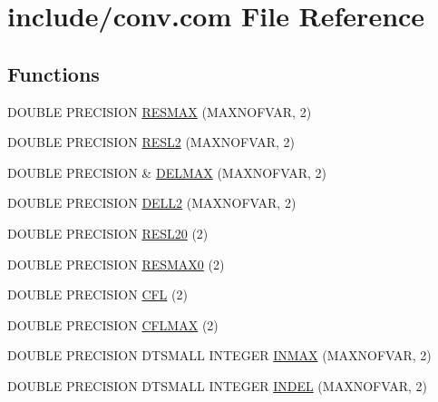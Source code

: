 \hypertarget{conv_8com}{\section{include/conv.com File Reference}
\label{conv_8com}
}
\subsection*{Functions}
\begin{DoxyCompactItemize}
\item 
D\-O\-U\-B\-L\-E P\-R\-E\-C\-I\-S\-I\-O\-N \hyperlink{conv_8com_adf31d6b2d57a615da367e41276e2c368}{R\-E\-S\-M\-A\-X} (M\-A\-X\-N\-O\-F\-V\-A\-R, 2)
\item 
D\-O\-U\-B\-L\-E P\-R\-E\-C\-I\-S\-I\-O\-N \hyperlink{conv_8com_a035fe6706d7b732830ffafb620f8a07b}{R\-E\-S\-L2} (M\-A\-X\-N\-O\-F\-V\-A\-R, 2)
\item 
D\-O\-U\-B\-L\-E P\-R\-E\-C\-I\-S\-I\-O\-N \& \hyperlink{conv_8com_aa36704749632fb4cb4f4b32adae95af0}{D\-E\-L\-M\-A\-X} (M\-A\-X\-N\-O\-F\-V\-A\-R, 2)
\item 
D\-O\-U\-B\-L\-E P\-R\-E\-C\-I\-S\-I\-O\-N \hyperlink{conv_8com_ad097628ad79bd4f6f53ba564741f0fc8}{D\-E\-L\-L2} (M\-A\-X\-N\-O\-F\-V\-A\-R, 2)
\item 
D\-O\-U\-B\-L\-E P\-R\-E\-C\-I\-S\-I\-O\-N \hyperlink{conv_8com_a6cae5dab4b3be52cf1bc44b46eb1d76a}{R\-E\-S\-L20} (2)
\item 
D\-O\-U\-B\-L\-E P\-R\-E\-C\-I\-S\-I\-O\-N \hyperlink{conv_8com_a8567ba07a46a456519bee5aa5a38b1da}{R\-E\-S\-M\-A\-X0} (2)
\item 
D\-O\-U\-B\-L\-E P\-R\-E\-C\-I\-S\-I\-O\-N \hyperlink{conv_8com_a13e33219ad81cfe3676bf98de68625b4}{C\-F\-L} (2)
\item 
D\-O\-U\-B\-L\-E P\-R\-E\-C\-I\-S\-I\-O\-N \hyperlink{conv_8com_ac6938ff34c279daaa8c7af56cd95f9cf}{C\-F\-L\-M\-A\-X} (2)
\item 
D\-O\-U\-B\-L\-E P\-R\-E\-C\-I\-S\-I\-O\-N D\-T\-S\-M\-A\-L\-L I\-N\-T\-E\-G\-E\-R \hyperlink{conv_8com_a281aba02624028804313692bfd933597}{I\-N\-M\-A\-X} (M\-A\-X\-N\-O\-F\-V\-A\-R, 2)
\item 
D\-O\-U\-B\-L\-E P\-R\-E\-C\-I\-S\-I\-O\-N D\-T\-S\-M\-A\-L\-L I\-N\-T\-E\-G\-E\-R \hyperlink{conv_8com_a268cd66fa54c868e3470a5082cbb9f4f}{I\-N\-D\-E\-L} (M\-A\-X\-N\-O\-F\-V\-A\-R, 2)
\end{DoxyCompactItemize}
